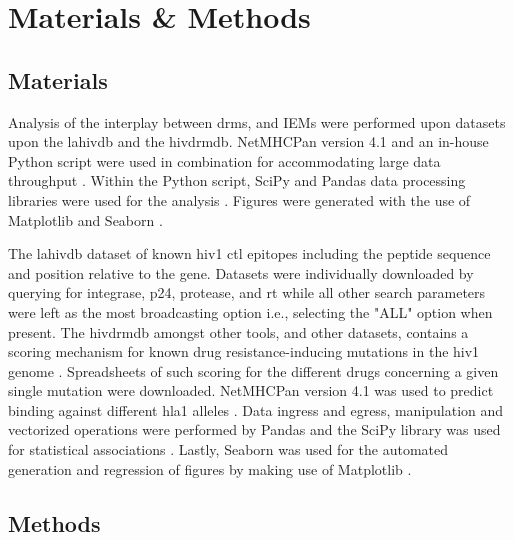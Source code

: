 \section{Materials \& Methods}

\subsection{Materials}

Analysis of the interplay between \acp{drm}, and IEMs were performed upon datasets upon the \ac{lahivdb} and the \ac{hivdrmdb}. NetMHCPan version 4.1 and an in-house Python script were used in combination for accommodating large data throughput \cite{reynissonNetMHCpan4NetMHCIIpan4Improved2020}. Within the Python script, SciPy and Pandas data processing libraries were used for the analysis \cite{2020SciPy-NMeth,the_pandas_development_team_2024_10957263}. Figures were generated with the use of Matplotlib and Seaborn \cite{hunterMatplotlib2DGraphics2007,Waskom2021}.

The \ac{lahivdb} dataset of known \ac{hiv1} \ac{ctl} epitopes including the peptide sequence and position relative to the gene. Datasets were individually downloaded by querying for integrase, p24, protease, and \ac{rt} while all other search parameters were left as the most broadcasting option i.e., selecting the "ALL" option when present. The \ac{hivdrmdb} amongst other tools, and other datasets, contains a scoring mechanism for known drug resistance-inducing mutations in the \ac{hiv1} genome \cite{rheeHIV1TransmittedDrug2020}. Spreadsheets of such scoring for the different drugs concerning a given single mutation were downloaded. NetMHCPan version 4.1 was used to predict binding against different \ac{hla1} alleles \cite{reynissonNetMHCpan4NetMHCIIpan4Improved2020}. Data ingress and egress, manipulation and vectorized operations were performed by Pandas and the SciPy library was used for statistical associations \cite{the_pandas_development_team_2024_10957263,2020SciPy-NMeth}. Lastly, Seaborn was used for the automated generation and regression of figures by making use of Matplotlib \cite{Waskom2021,hunterMatplotlib2DGraphics2007}.

\subsection{Methods}

